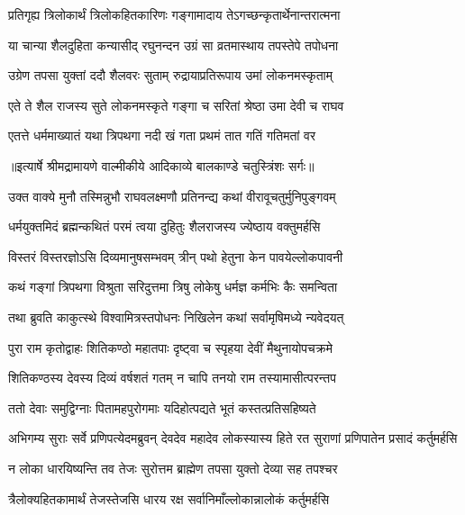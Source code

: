 \twolineshloka
{प्रतिगृह्य त्रिलोकार्थं त्रिलोकहितकारिणः}
{गङ्गामादाय तेऽगच्छन्कृतार्थेनान्तरात्मना} %

\twolineshloka
{या चान्या शैलदुहिता कन्यासीद् रघुनन्दन}
{उग्रं सा व्रतमास्थाय तपस्तेपे तपोधना} %

\twolineshloka
{उग्रेण तपसा युक्तां ददौ शैलवरः सुताम्}
{रुद्रायाप्रतिरूपाय उमां लोकनमस्कृताम्} %

\twolineshloka
{एते ते शैल राजस्य सुते लोकनमस्कृते}
{गङ्गा च सरितां श्रेष्ठा उमा देवी च राघव} %

\twolineshloka
{एतत्ते धर्ममाख्यातं यथा त्रिपथगा नदी}
{खं गता प्रथमं तात गतिं गतिमतां वर} %


{॥इत्यार्षे श्रीमद्रामायणे वाल्मीकीये आदिकाव्ये बालकाण्डे चतुस्त्रिंशः सर्गः॥}


\twolineshloka
{उक्त वाक्ये मुनौ तस्मिन्नुभौ राघवलक्ष्मणौ}
{प्रतिनन्द्य कथां वीरावूचतुर्मुनिपुङ्गवम्} %

\twolineshloka
{धर्मयुक्तमिदं ब्रह्मन्कथितं परमं त्वया}
{दुहितुः शैलराजस्य ज्येष्ठाय वक्तुमर्हसि} %

\twolineshloka
{विस्तरं विस्तरज्ञोऽसि दिव्यमानुषसम्भवम्}
{त्रीन् पथो हेतुना केन पावयेल्लोकपावनी} %

\twolineshloka
{कथं गङ्गां त्रिपथगा विश्रुता सरिदुत्तमा}
{त्रिषु लोकेषु धर्मज्ञ कर्मभिः कैः समन्विता} %

\twolineshloka
{तथा ब्रुवति काकुत्स्थे विश्वामित्रस्तपोधनः}
{निखिलेन कथां सर्वामृषिमध्ये न्यवेदयत्} %

\twolineshloka
{पुरा राम कृतोद्वाहः शितिकण्ठो महातपाः}
{दृष्ट्वा च स्पृहया देवीं मैथुनायोपचक्रमे} %

\twolineshloka
{शितिकण्ठस्य देवस्य दिव्यं वर्षशतं गतम्}
{न चापि तनयो राम तस्यामासीत्परन्तप} %

\twolineshloka
{ततो देवाः समुद्विग्नाः पितामहपुरोगमाः}
{यदिहोत्पद्यते भूतं कस्तत्प्रतिसहिष्यते} %

\threelineshloka
{अभिगम्य सुराः सर्वे प्रणिपत्येदमब्रुवन्}
{देवदेव महादेव लोकस्यास्य हिते रत}
{सुराणां प्रणिपातेन प्रसादं कर्तुमर्हसि} %

\twolineshloka
{न लोका धारयिष्यन्ति तव तेजः सुरोत्तम}
{ब्राह्मेण तपसा युक्तो देव्या सह तपश्चर} %

\twolineshloka
{त्रैलोक्यहितकामार्थं तेजस्तेजसि धारय}
{रक्ष सर्वानिमाँल्लोकान्नालोकं कर्तुमर्हसि} %

